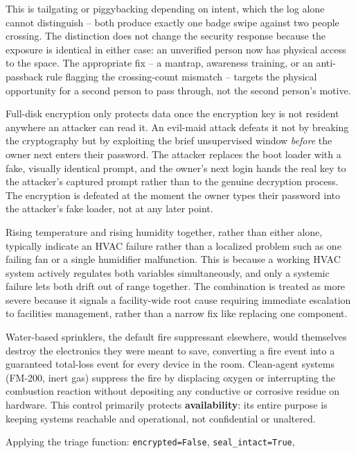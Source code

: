 \begin{answerkey}
\item This is tailgating or piggybacking depending on intent, which the log alone cannot
distinguish -- both produce exactly one badge swipe against two people crossing. The distinction
does not change the security response because the exposure is identical in either case: an
unverified person now has physical access to the space. The appropriate fix -- a mantrap,
awareness training, or an anti-passback rule flagging the crossing-count mismatch -- targets the
physical opportunity for a second person to pass through, not the second person's motive.
\item Full-disk encryption only protects data once the encryption key is not resident anywhere an
attacker can read it. An evil-maid attack defeats it not by breaking the cryptography but by
exploiting the brief unsupervised window \emph{before} the owner next enters their password. The
attacker replaces the boot loader with a fake, visually identical prompt, and the owner's next
login hands the real key to the attacker's captured prompt rather than to the genuine decryption
process. The encryption is defeated at the moment the owner types their password into the
attacker's fake loader, not at any later point.
\item Rising temperature and rising humidity together, rather than either alone, typically indicate
an HVAC failure rather than a localized problem such as one failing fan or a single humidifier
malfunction. This is because a working HVAC system actively regulates both variables
simultaneously, and only a systemic failure lets both drift out of range together. The combination
is treated as more severe because it signals a facility-wide root cause requiring immediate
escalation to facilities management, rather than a narrow fix like replacing one component.
\item Water-based sprinklers, the default fire suppressant elsewhere, would themselves destroy the
electronics they were meant to save, converting a fire event into a guaranteed total-loss event for
every device in the room. Clean-agent systems (FM-200, inert gas) suppress the fire by displacing
oxygen or interrupting the combustion reaction without depositing any conductive or corrosive
residue on hardware. This control primarily protects \textbf{availability}: its entire purpose is
keeping systems reachable and operational, not confidential or unaltered.
\item Applying the triage function: \texttt{encrypted=False}, \texttt{seal\_intact=True},

\end{answerkey}
